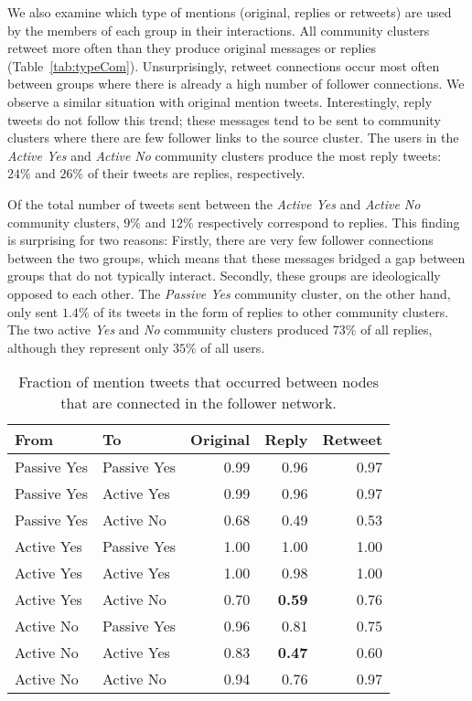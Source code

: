\documentclass{article}
\begin{document}
We also examine which type of mentions (original, replies or retweets)
are used by the members of each group in their interactions. All
community clusters retweet more often than they produce original
messages or replies (Table~\ref{tab:typeCom}). Unsurprisingly, retweet
connections occur most often between groups where there is already a
high number of follower connections. We observe a similar situation
with original mention tweets.  Interestingly, reply tweets do not
follow this trend; these messages tend to be sent to community
clusters where there are few follower links to the source cluster.
The users in the {\it Active Yes} and {\it Active No} community
clusters produce the most reply tweets: $24\%$ and $26\%$ of their
tweets are replies, respectively.

Of the total number of tweets sent between the {\it Active Yes} and
{\it Active No} community clusters, $9\%$ and $12\%$ respectively
correspond to replies. This finding is surprising for two reasons:
Firstly, there are very few follower connections between the two
groups, which means that these messages bridged a gap between groups
that do not typically interact.  Secondly, these groups are
ideologically opposed to each other. The {\it Passive Yes} community
cluster, on the other hand, only sent $1.4\%$ of its tweets in the
form of replies to other community clusters. The two active {\it Yes}
and {\it No} community clusters produced $73\%$ of all replies,
although they represent only $35\%$ of all users.

\begin{table}[tp]
\centering
\begin{tabular}{ll|rrr}
From        & To          & Original & Reply & Retweet \\ \hline
Passive Yes & Passive Yes & 0.99     & 0.96  & 0.97    \\
Passive Yes & Active Yes  & 0.99     & 0.96  & 0.97    \\
Passive Yes & Active No   & 0.68     & 0.49  & 0.53    \\ \hline
Active Yes  & Passive Yes & 1.00     & 1.00  & 1.00    \\
Active Yes  & Active Yes  & 1.00     & 0.98  & 1.00    \\
Active Yes  & Active No   & 0.70     & {\bf 0.59}  & 0.76    \\ \hline
Active No   & Passive Yes & 0.96     & 0.81  & 0.75    \\
Active No   & Active Yes  & 0.83     & {\bf 0.47}  & 0.60    \\
Active No   & Active No   & 0.94     & 0.76  & 0.97   
\end{tabular}
\caption{Fraction of mention tweets that occurred between nodes that
  are connected in the follower network.}
\label{tab:FracAlongPipe}
\end{table}
\end{document}
